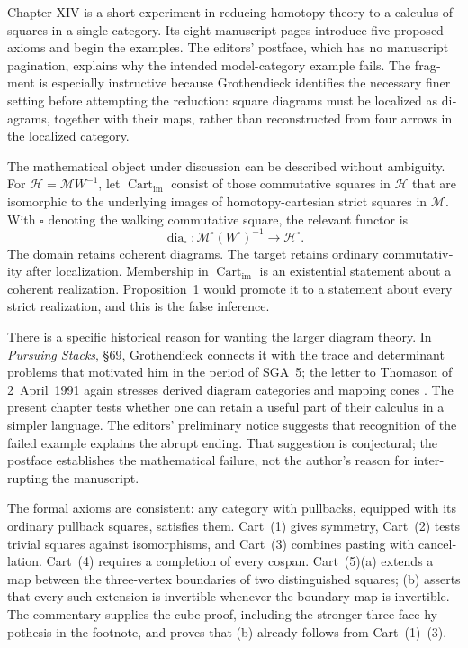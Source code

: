 \begin{otherlanguage}{english}
Chapter XIV is a short experiment in reducing homotopy theory to a calculus of squares in a single category. Its eight manuscript pages introduce five proposed axioms and begin the examples. The editors' postface, which has no manuscript pagination, explains why the intended model-category example fails. The fragment is especially instructive because Grothendieck identifies the necessary finer setting before attempting the reduction: square diagrams must be localized as diagrams, together with their maps, rather than reconstructed from four arrows in the localized category.

The mathematical object under discussion can be described without ambiguity. For $\mathcal H=\mathcal MW^{-1}$, let $\operatorname{Cart}_{\mathrm{im}}$ consist of those commutative squares in $\mathcal H$ that are isomorphic to the underlying images of homotopy-cartesian strict squares in $\mathcal M$. With $\square$ denoting the walking commutative square, the relevant functor is
\[
\operatorname{dia}_{\square}:
\mathcal M^{\square}(W^{\square})^{-1}
\longrightarrow\mathcal H^{\square}.
\]
The domain retains coherent diagrams. The target retains ordinary commutativity after localization. Membership in $\operatorname{Cart}_{\mathrm{im}}$ is an existential statement about a coherent realization. Proposition~1 would promote it to a statement about every strict realization, and this is the false inference.

There is a specific historical reason for wanting the larger diagram theory. In \emph{Pursuing Stacks}, \S69, Grothendieck connects it with the trace and determinant problems that motivated him in the period of SGA~5; the letter to Thomason of 2~April~1991 again stresses derived diagram categories and mapping cones \citep{Grothendieck1983,Grothendieck1991Letter}. The present chapter tests whether one can retain a useful part of their calculus in a simpler language. The editors' preliminary notice suggests that recognition of the failed example explains the abrupt ending. That suggestion is conjectural; the postface establishes the mathematical failure, not the author's reason for interrupting the manuscript.

The formal axioms are consistent: any category with pullbacks, equipped with its ordinary pullback squares, satisfies them. Cart~(1) gives symmetry, Cart~(2) tests trivial squares against isomorphisms, and Cart~(3) combines pasting with cancellation. Cart~(4) requires a completion of every cospan. Cart~(5)(a) extends a map between the three-vertex boundaries of two distinguished squares; (b) asserts that every such extension is invertible whenever the boundary map is invertible. The commentary supplies the cube proof, including the stronger three-face hypothesis in the footnote, and proves that (b) already follows from Cart~(1)--(3).


\end{otherlanguage}
